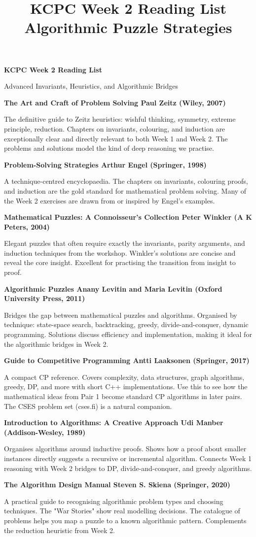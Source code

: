 \documentclass[11pt]{article}
\title{KCPC Week 2 Reading List\\Algorithmic Puzzle Strategies}
\author{}
\date{}
\newcommand{\bookentry}[2]{\textbf{#1}\par #2\par\vspace{7pt}}
\begin{document}
\thispagestyle{fancy}

\begin{center}
    {\LARGE\bfseries KCPC Week 2 Reading List}\par
    \vspace{2pt}
    {\large Advanced Invariants, Heuristics, and Algorithmic Bridges}
\end{center}
\vspace{5pt}

\bookentry{The Art and Craft of Problem Solving Paul Zeitz (Wiley,
2007)}{The definitive guide to Zeitz heuristics: wishful thinking,
    symmetry, extreme principle, reduction. Chapters on invariants,
    colouring, and induction are exceptionally clear and directly
    relevant to both Week 1 and Week 2. The problems and solutions model
the kind of deep reasoning we practise.}

\bookentry{Problem-Solving Strategies Arthur Engel (Springer,
1998)}{A technique-centred encyclopaedia. The chapters on invariants,
    colouring proofs, and induction are the gold standard for
    mathematical problem solving. Many of the Week 2 exercises are drawn
from or inspired by Engel's examples.}

\bookentry{Mathematical Puzzles: A Connoisseur's Collection Peter
Winkler (A K Peters, 2004)}{Elegant puzzles that often require
    exactly the invariants, parity arguments, and induction techniques
    from the workshop. Winkler's solutions are concise and reveal the
core insight. Excellent for practising the transition from insight to proof.}

\bookentry{Algorithmic Puzzles Anany Levitin and Maria Levitin
(Oxford University Press, 2011)}{Bridges the gap between mathematical
    puzzles and algorithms. Organised by technique: state-space search,
    backtracking, greedy, divide-and-conquer, dynamic programming.
    Solutions discuss efficiency and implementation, making it ideal for
the algorithmic bridges in Week 2.}

\bookentry{Guide to Competitive Programming Antti Laaksonen
(Springer, 2017)}{A compact CP reference. Covers complexity, data
    structures, graph algorithms, greedy, DP, and more with short C++
    implementations. Use this to see how the mathematical ideas from Pair
    1 become standard CP algorithms in later pairs. The CSES problem set
(cses.fi) is a natural companion.}

\bookentry{Introduction to Algorithms: A Creative Approach Udi Manber
(Addison-Wesley, 1989)}{Organises algorithms around inductive proofs.
    Shows how a proof about smaller instances directly suggests a
    recursive or incremental algorithm. Connects Week 1 reasoning with
Week 2 bridges to DP, divide-and-conquer, and greedy algorithms.}

\bookentry{The Algorithm Design Manual Steven S. Skiena (Springer,
2020)}{A practical guide to recognising algorithmic problem types and
    choosing techniques. The "War Stories" show real modelling decisions.
    The catalogue of problems helps you map a puzzle to a known
algorithmic pattern. Complements the reduction heuristic from Week 2.}
\end{document}
